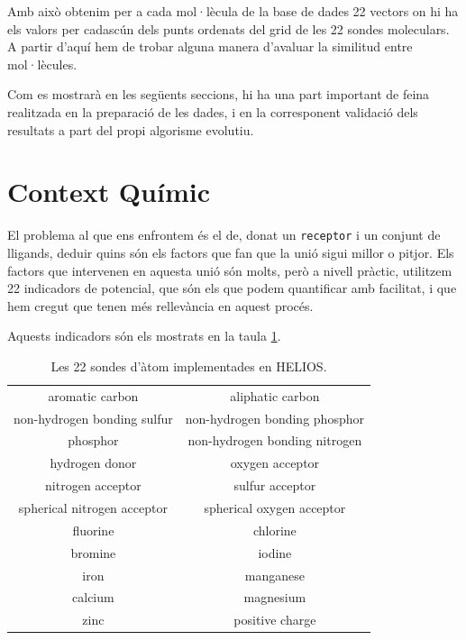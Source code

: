 Amb això obtenim per a cada mol·lècula de la base de dades 22 vectors on hi ha els valors per cadascún dels punts ordenats del grid de les 22 sondes moleculars. A partir d'aquí hem de trobar alguna manera d'avaluar la similitud entre mol·lècules.

Com es mostrarà en les següents seccions, hi ha una part important de feina
realitzada en la preparació de les dades, i en la corresponent validació dels
resultats a part del propi algorisme evolutiu.


\section{Context Químic} %
\label{sec:Context Quimic}

El problema al que ens enfrontem és el de, donat un \texttt{receptor} i un conjunt de %
lligands, deduir quins són els factors que fan que la unió sigui millor
o pitjor.  Els factors que intervenen en aquesta unió són molts, però a nivell
pràctic, utilitzem 22 indicadors de potencial, que són els que podem quantificar amb
facilitat, i que hem cregut que tenen més rellevància en aquest procés.

Aquests indicadors són els mostrats en la taula \ref{table:maps}.

\begin{table}
\centering
\begin{tabular}{|cc|}
\hline
aromatic carbon             & aliphatic carbon\\
non-hydrogen bonding sulfur & non-hydrogen bonding phosphor\\
phosphor                    & non-hydrogen bonding nitrogen\\
hydrogen donor              & oxygen acceptor\\
nitrogen acceptor           & sulfur acceptor\\
spherical nitrogen acceptor & spherical oxygen acceptor\\
fluorine                    & chlorine\\
bromine                     & iodine\\
iron                        & manganese\\
calcium                     & magnesium\\
zinc                        & positive charge\\
\hline
\end{tabular}
\caption{Les 22 sondes d'àtom implementades en HELIOS.}
\label{table:maps}
\end{table}


